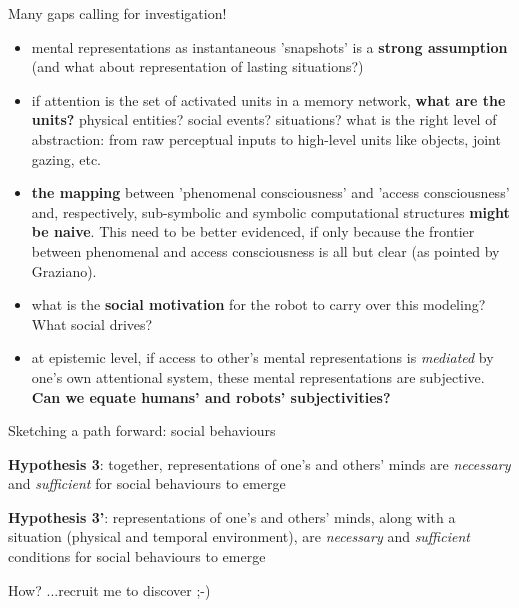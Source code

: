 \documentclass[handout,compress]{beamer}
\begin{document}

\begin{frame}{Many gaps calling for investigation!}

\footnotesize
    \begin{itemize}

        \item<+-> mental representations as instantaneous 'snapshots' is a {\bf strong
            assumption} (and what about representation of lasting situations?)

        \item<+-> if attention is the set of activated units in a memory network,
            {\bf what are the units?} physical entities? social events? situations?
            what is the right level of abstraction: from raw perceptual inputs to
            high-level units like objects, joint gazing, etc.


        \item<+-> {\bf the mapping} between 'phenomenal consciousness' and
            'access consciousness' and, respectively, sub-symbolic and symbolic
            computational structures {\bf might be naive}. This need to be
            better evidenced, if only because the frontier between phenomenal
            and access consciousness is all but clear (as pointed by Graziano).

        \item<+-> what is the {\bf social motivation} for the robot to carry
            over this modeling? What social drives?

        \item<+-> at epistemic level, if access to other's mental
            representations is \emph{mediated} by one's own attentional system,
            these mental representations are subjective. {\bf Can we equate humans'
            and robots' subjectivities?}

    \end{itemize}

\end{frame}


\begin{frame}{Sketching a path forward: social behaviours}

    {\bf Hypothesis 3}: together, representations of one's and others' minds are
    \emph{necessary} and \emph{sufficient} for social behaviours to emerge

    {\bf Hypothesis 3'}: representations of one's and others' minds, along with
    a situation (physical and temporal environment), are \emph{necessary} and
    \emph{sufficient} conditions for social behaviours to emerge

    \pause

    How? ...recruit me to discover ;-)


\end{frame}
\end{document}
